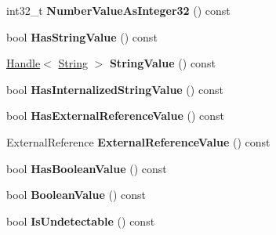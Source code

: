 \begin{DoxyCompactItemize}
\item 
\hypertarget{classv8_1_1internal_1_1_v8___f_i_n_a_l_a2ef709abced6dea751adf6d8b6ac4662}{}int32\+\_\+t {\bfseries Number\+Value\+As\+Integer32} () const \label{classv8_1_1internal_1_1_v8___f_i_n_a_l_a2ef709abced6dea751adf6d8b6ac4662}

\item 
\hypertarget{classv8_1_1internal_1_1_v8___f_i_n_a_l_a49a1e671174f5ce3da3ab9efa9b64909}{}bool {\bfseries Has\+String\+Value} () const \label{classv8_1_1internal_1_1_v8___f_i_n_a_l_a49a1e671174f5ce3da3ab9efa9b64909}

\item 
\hypertarget{classv8_1_1internal_1_1_v8___f_i_n_a_l_a90652c79080d39e25910bb8ac5fdbce0}{}\hyperlink{classv8_1_1internal_1_1_handle}{Handle}$<$ \hyperlink{classv8_1_1internal_1_1_string}{String} $>$ {\bfseries String\+Value} () const \label{classv8_1_1internal_1_1_v8___f_i_n_a_l_a90652c79080d39e25910bb8ac5fdbce0}

\item 
\hypertarget{classv8_1_1internal_1_1_v8___f_i_n_a_l_a2a8523c88ba5172ffba18bf8be33c8ba}{}bool {\bfseries Has\+Internalized\+String\+Value} () const \label{classv8_1_1internal_1_1_v8___f_i_n_a_l_a2a8523c88ba5172ffba18bf8be33c8ba}

\item 
\hypertarget{classv8_1_1internal_1_1_v8___f_i_n_a_l_aa844b6986b09fd29776755feeda22532}{}bool {\bfseries Has\+External\+Reference\+Value} () const \label{classv8_1_1internal_1_1_v8___f_i_n_a_l_aa844b6986b09fd29776755feeda22532}

\item 
\hypertarget{classv8_1_1internal_1_1_v8___f_i_n_a_l_a9c9a93d0ec13728e30f10d218b17ee9f}{}External\+Reference {\bfseries External\+Reference\+Value} () const \label{classv8_1_1internal_1_1_v8___f_i_n_a_l_a9c9a93d0ec13728e30f10d218b17ee9f}

\item 
\hypertarget{classv8_1_1internal_1_1_v8___f_i_n_a_l_a72a1415f369ddca765122a312f890325}{}bool {\bfseries Has\+Boolean\+Value} () const \label{classv8_1_1internal_1_1_v8___f_i_n_a_l_a72a1415f369ddca765122a312f890325}

\item 
\hypertarget{classv8_1_1internal_1_1_v8___f_i_n_a_l_a85e8df751af13feef4e4427a57007aa1}{}bool {\bfseries Boolean\+Value} () const \label{classv8_1_1internal_1_1_v8___f_i_n_a_l_a85e8df751af13feef4e4427a57007aa1}

\item 
\hypertarget{classv8_1_1internal_1_1_v8___f_i_n_a_l_a9aa7956e0b9cb07eb4bdf8c4577910e4}{}bool {\bfseries Is\+Undetectable} () const \label{classv8_1_1internal_1_1_v8___f_i_n_a_l_a9aa7956e0b9cb07eb4bdf8c4577910e4}


\end{DoxyCompactItemize}
